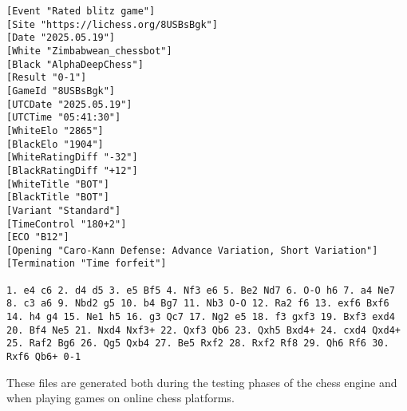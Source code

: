\vspace{1em}

\begin{lstlisting}[basicstyle=\ttfamily\small, captionpos=b, breaklines=true, frame=single, caption={Example of a PGN file}, label={lst:pgn-example}]
[Event "Rated blitz game"]
[Site "https://lichess.org/8USBsBgk"]
[Date "2025.05.19"]
[White "Zimbabwean_chessbot"]
[Black "AlphaDeepChess"]
[Result "0-1"]
[GameId "8USBsBgk"]
[UTCDate "2025.05.19"]
[UTCTime "05:41:30"]
[WhiteElo "2865"]
[BlackElo "1904"]
[WhiteRatingDiff "-32"]
[BlackRatingDiff "+12"]
[WhiteTitle "BOT"]
[BlackTitle "BOT"]
[Variant "Standard"]
[TimeControl "180+2"]
[ECO "B12"]
[Opening "Caro-Kann Defense: Advance Variation, Short Variation"]
[Termination "Time forfeit"]

1. e4 c6 2. d4 d5 3. e5 Bf5 4. Nf3 e6 5. Be2 Nd7 6. O-O h6 7. a4 Ne7 8. c3 a6 9. Nbd2 g5 10. b4 Bg7 11. Nb3 O-O 12. Ra2 f6 13. exf6 Bxf6 14. h4 g4 15. Ne1 h5 16. g3 Qc7 17. Ng2 e5 18. f3 gxf3 19. Bxf3 exd4 20. Bf4 Ne5 21. Nxd4 Nxf3+ 22. Qxf3 Qb6 23. Qxh5 Bxd4+ 24. cxd4 Qxd4+ 25. Raf2 Bg6 26. Qg5 Qxb4 27. Be5 Rxf2 28. Rxf2 Rf8 29. Qh6 Rf6 30. Rxf6 Qb6+ 0-1
\end{lstlisting}

These files are generated both during the testing phases of the chess engine and when playing games on online chess platforms.
